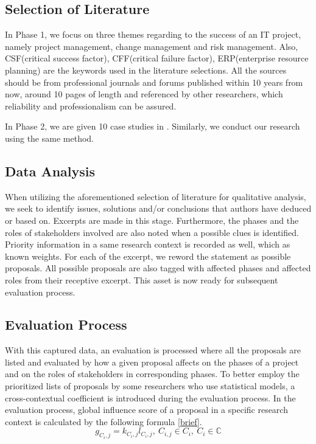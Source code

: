 \subsection{Selection of Literature}
In Phase 1, we focus on three themes regarding to the success of an IT project, namely project management, change management and risk management. Also, CSF(critical success factor), CFF(critical failure factor), ERP(enterprise resource planning) are the keywords used in the literature selections. All the sources should be from professional journals and forums published within 10 years from now, around 10 pages of length and referenced by other researchers, which reliability and professionalism can be assured.

In Phase 2, we are given 10 case studies in . Similarly, we conduct our research using the same method.

\subsection{Data Analysis}
When utilizing the aforementioned selection of literature for qualitative analysis, we seek to identify issues, solutions and/or conclusions that authors have deduced or based on. Excerpts are made in this stage. Furthermore, the phases and the roles of stakeholders involved are also noted when a possible clues is identified. Priority information in a same research context is recorded as well, which as known weights. For each of the excerpt, we reword the statement as possible proposals. All possible proposals are also tagged with affected phases and affected roles from their receptive excerpt. This asset is now ready for subsequent evaluation process.

\subsection{Evaluation Process}
With this captured data, an evaluation is processed where all the proposals are listed and evaluated by how a given proposal affects on the phases of a project and on the roles of stakeholders in corresponding phases. To better employ the prioritized lists of proposals by some researchers who use statistical models, a cross-contextual coefficient is introduced during the evaluation process. In the evaluation process, global influence score of a proposal in a specific research context is calculated by the following formula \ref{brief}.
\begin{equation}
g_{C_{i},j} = \mathit{k_{C_{i},j}}l_{C_{i},j},\ C_{i,j} \in C_{i},\ C_{i} \in \mathbb{C}
\label{brief}
\end{equation}


